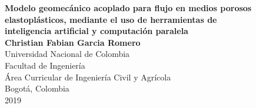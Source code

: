 %




\begin{center}
\begin{figure}
\centering%
\vspace*{-1.5cm}
%
\end{figure}

\thispagestyle{empty} 
\vspace*{0.5cm} 
\textbf{\Huge Modelo geomecánico acoplado para flujo en medios porosos elastoplásticos, mediante el uso de herramientas de }\\[0.21cm]
\textbf{\Huge inteligencia artificial y computación paralela}\\[3.5cm]

\LARGE\textbf{Christian Fabian Garcia Romero}\\[4.5cm]

\normalsize Universidad Nacional de Colombia\\
Facultad de Ingeniería\\
Área Curricular de Ingeniería Civil y Agrícola \\
Bogotá, Colombia\\
2019\\
\end{center}

\newpage{\pagestyle{empty}\cleardoublepage}


